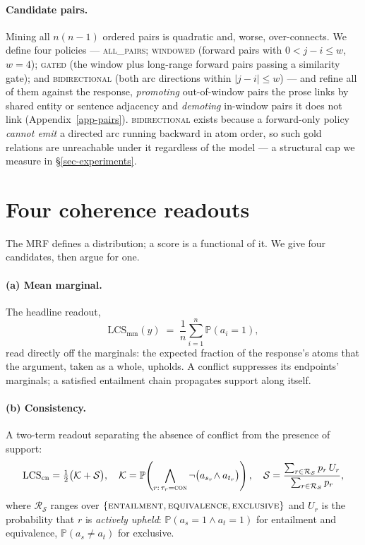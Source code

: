 \documentclass{article} %
\newcommand{\pr}[1]{\mathbb{P}\!\left( #1 \right)}
\newcommand{\coupling}[1]{\textsc{#1}}          %
\newcommand{\con}{\coupling{con}}
\newcommand{\LCS}{\mathrm{LCS}}
\newcommand{\readout}[1]{\ensuremath{\mathrm{#1}}}
\newcommand{\mm}{\readout{mm}}
\newcommand{\cons}{\readout{cn}}
\begin{document}
\paragraph{Candidate pairs.} Mining all $n(n-1)$ ordered pairs is quadratic and, worse,
over-connects. We define four policies --- \textsc{all\_pairs}; \textsc{windowed} (forward pairs
with $0<j-i\le w$, $w=4$); \textsc{gated} (the window plus long-range forward pairs passing a
similarity gate); and \textsc{bidirectional} (both arc directions within $|j-i|\le w$) --- and
refine all of them against the response, \emph{promoting} out-of-window pairs the prose links by
shared entity or sentence adjacency and \emph{demoting} in-window pairs it does not link
(Appendix~\ref{app-pairs}). \textsc{bidirectional} exists because a forward-only policy
\emph{cannot emit} a directed arc running backward in atom order, so such gold relations are
unreachable under it regardless of the model --- a structural cap we measure in
\S\ref{sec-experiments}.

\section{Four coherence readouts}
\label{sec-readouts}

The MRF defines a distribution; a score is a functional of it. We give four candidates, then argue
for one.

\paragraph{(a) Mean marginal.} The headline readout,
\begin{equation}
\LCS_{\mm}(y) \;=\; \frac{1}{n}\sum_{i=1}^{n}\pr{a_i=1},
\label{eq-mm}
\end{equation}
read directly off the marginals: the expected fraction of the response's atoms that the argument,
taken as a whole, upholds. A conflict suppresses its endpoints' marginals; a satisfied entailment
chain propagates support along itself.

\paragraph{(b) Consistency.} A two-term readout separating the absence of conflict from
the presence of support:
\begin{equation}
\LCS_{\cons} = \tfrac12\bigl(\mathcal{K}+\mathcal{S}\bigr),\quad
\mathcal{K} = \pr{\bigwedge_{r:\,\tau_r=\con}\neg\bigl(a_{s_r}\!\wedge a_{t_r}\bigr)},\quad
\mathcal{S} = \frac{\sum_{r\in\mathcal{R}_{\mathcal{S}}} p_r\,U_r}
                   {\sum_{r\in\mathcal{R}_{\mathcal{S}}} p_r},
\label{eq-cons}
\end{equation}
where $\mathcal{R}_{\mathcal{S}}$ ranges over
$\{\coupling{entailment},\coupling{equivalence},\coupling{exclusive}\}$ and $U_r$ is the
probability that $r$ is \emph{actively upheld}: $\pr{a_{s}{=}1\wedge a_{t}{=}1}$ for
entailment and equivalence, $\pr{a_s\neq a_t}$ for exclusive.
\end{document}
